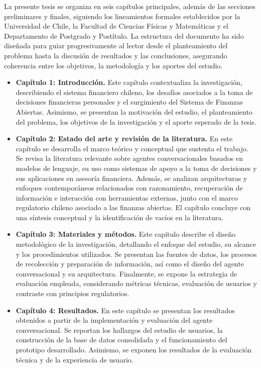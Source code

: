 \documentclass[
	spanish, %
	letterpaper, oneside
]{book}
\begin{document}
La presente tesis se organiza en seis capítulos principales, además de las secciones preliminares y finales, siguiendo los lineamientos formales establecidos por la Universidad de Chile, la Facultad de Ciencias Físicas y Matemáticas y el Departamento de Postgrado y Postítulo. La estructura del documento ha sido diseñada para guiar progresivamente al lector desde el planteamiento del problema hasta la discusión de resultados y las conclusiones, asegurando coherencia entre los objetivos, la metodología y los aportes del estudio.

\begin{itemize}
    \item \textbf{Capítulo 1: Introducción.}  
    Este capítulo contextualiza la investigación, describiendo el sistema financiero chileno, los desafíos asociados a la toma de decisiones financieras personales y el surgimiento del Sistema de Finanzas Abiertas. Asimismo, se presentan la motivación del estudio, el planteamiento del problema, los objetivos de la investigación y el aporte esperado de la tesis.

    \item \textbf{Capítulo 2: Estado del arte y revisión de la literatura.}  
    En este capítulo se desarrolla el marco teórico y conceptual que sustenta el trabajo. Se revisa la literatura relevante sobre agentes conversacionales basados en modelos de lenguaje, su uso como sistemas de apoyo a la toma de decisiones y sus aplicaciones en asesoría financiera. Además, se analizan arquitecturas y enfoques contemporáneos relacionados con razonamiento, recuperación de información e interacción con herramientas externas, junto con el marco regulatorio chileno asociado a las finanzas abiertas. El capítulo concluye con una síntesis conceptual y la identificación de vacíos en la literatura.

    \item \textbf{Capítulo 3: Materiales y métodos.}  
    Este capítulo describe el diseño metodológico de la investigación, detallando el enfoque del estudio, su alcance y los procedimientos utilizados. Se presentan las fuentes de datos, los procesos de recolección y preparación de información, así como el diseño del agente conversacional y su arquitectura. Finalmente, se expone la estrategia de evaluación empleada, considerando métricas técnicas, evaluación de usuarios y contraste con principios regulatorios.

    \item \textbf{Capítulo 4: Resultados.}  
    En este capítulo se presentan los resultados obtenidos a partir de la implementación y evaluación del agente conversacional. Se reportan los hallazgos del estudio de usuarios, la construcción de la base de datos consolidada y el funcionamiento del prototipo desarrollado. Asimismo, se exponen los resultados de la evaluación técnica y de la experiencia de usuario.


\end{itemize}
\end{document}
